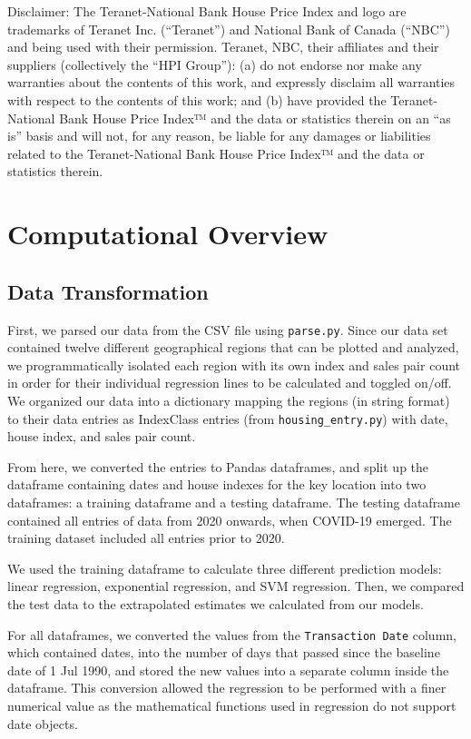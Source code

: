 \documentclass{article}
\begin{document}
Disclaimer: The Teranet-National Bank House Price Index and logo are trademarks of Teranet Inc. (“Teranet”) and National Bank of Canada (“NBC”) and being used with their permission. Teranet, NBC, their affiliates and their suppliers (collectively the “HPI Group”): (a) do not endorse nor make any warranties about the contents of this work, and expressly disclaim all warranties with respect to the contents of this work; and (b) have provided the Teranet-National Bank House Price Index™ and the data or statistics therein on an “as is” basis and will not, for any reason, be liable for any damages or liabilities related to the Teranet-National Bank House Price Index™ and the data or statistics therein.


\section{Computational Overview}

\subsection{Data Transformation}

First, we parsed our data from the CSV file using \texttt{parse.py}. Since our data set contained twelve different geographical regions that can be plotted and analyzed, we programmatically isolated each region with its own index and sales pair count in order for their individual regression lines to be calculated and toggled on/off. We organized our data into a dictionary mapping the regions (in string format) to their data entries as IndexClass entries (from \texttt{housing\_entry.py}) with date, house index, and sales pair count.

From here, we converted the entries to Pandas dataframes, and split up the dataframe containing dates and house indexes for the key location into two dataframes: a training dataframe and a testing dataframe. The testing dataframe contained all entries of data from 2020 onwards, when COVID-19 emerged. The training dataset included all entries prior to 2020.

We used the training dataframe to calculate three different prediction models: linear regression, exponential regression, and SVM regression. Then, we compared the test data to the extrapolated estimates we calculated from our models.

For all dataframes, we converted the values from the \texttt{Transaction Date} column, which contained dates, into the number of days that passed since the baseline date of 1 Jul 1990, and stored the new values into a separate column inside the dataframe. This conversion allowed the regression to be performed with a finer numerical value as the mathematical functions used in regression do not support date objects.
\end{document}
